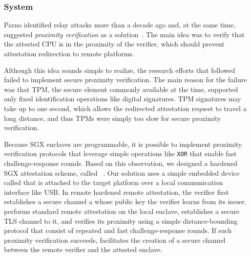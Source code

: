 \subsubsection*{\proximitee System}

Parno identified relay attacks more than a decade ago and, at the same time, suggested \emph{proximity verification} as a solution~\cite{parno2008bootstrapping}. The main idea was to verify that the attested CPU is in the proximity of the verifier, which should prevent attestation redirection to remote platforms. 

Although this idea sounds simple to realize, the research efforts that followed failed to implement secure proximity verification. The main reason for the failure was that TPM, the secure element commonly available at the time, supported only fixed identification operations like digital signatures. TPM signatures may take up to one second, which allows the redirected attestation request to travel a long distance, and thus TPMs were simply too slow for secure proximity verification. %

Because SGX enclaves are programmable, it is possible to implement proximity verification protocols that leverage simple operations like \texttt{XOR} that enable fast challenge-response rounds. Based on this observation, we designed a hardened SGX attestation scheme, called \proximitee~\cite{proximitee}. %
Our solution uses a simple embedded device called \key that is attached to the target platform over a local communication interface like USB. In remote hardened remote attestation, the verifier first establishes a secure channel a \key whose public key the verifier learns from its issuer. \key performs standard remote attestation on the local enclave, establishes a secure TLS channel to it, and verifies its proximity using a simple distance-bounding protocol that consist of repeated and fast challenge-response rounds. If such proximity verification succeeds, \key facilitates the creation of a secure channel between the remote verifier and the attested enclave. 


